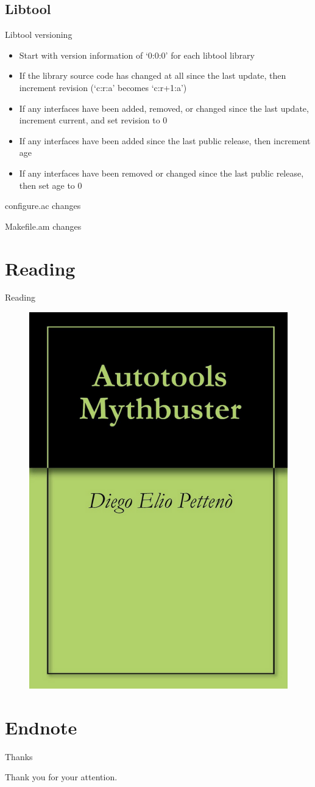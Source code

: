 \documentclass{beamer}
\begin{document}
\subsection{Libtool}

\begin{frame}{Libtool versioning}
	\begin{itemize}
	\item Start with version information of ‘0:0:0’ for each libtool library
	\item If the library source code has changed at all since the last update, then increment revision (‘c:r:a’ becomes ‘c:r+1:a’)
	\item If any interfaces have been added, removed, or changed since the last update, increment current, and set revision to 0
	\item If any interfaces have been added since the last public release, then increment age
	\item If any interfaces have been removed or changed since the last public release, then set age to 0
	\end{itemize}
\end{frame}

\begin{frame}[t]{configure.ac changes}
	\begin{small}
	
	\end{small}
\end{frame}

\begin{frame}[t]{Makefile.am changes}
	\begin{small}
	
	\end{small}
\end{frame}

\section{Reading}

\begin{frame}{Reading}
	\begin{figure}
	\includegraphics[width= 0.4\linewidth]{mythbuster.png}
	\end{figure}
\end{frame}

\section{Endnote}

\begin{frame}{Thanks}
	\begin{center}
	Thank you for your attention.
	\end{center}
\end{frame}
\end{document}
